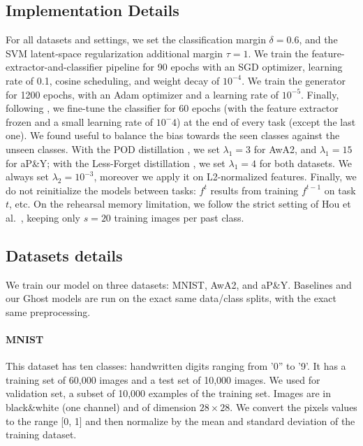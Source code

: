 \subsection{Implementation Details} For all datasets and settings, we set the classification margin
$\delta=0.6$, and the SVM latent-space regularization additional margin $\tau=1$. We train the
feature-extractor-and-classifier pipeline for 90 epochs with an SGD optimizer, learning rate of 0.1,
cosine scheduling, and weight decay of $10^{-4}$. We train the generator for 1200 epochs, with an
Adam optimizer and a learning rate of $10^{-5}$. Finally, following
\cite{hou2019ucir,douillard2020podnet}, we fine-tune the classifier for 60 epochs (with the feature
extractor frozen and a small learning rate of $10^-4$) at the end of every task (except the last
one). We found useful to balance the bias towards the seen classes against the unseen classes. With
the POD distillation \cite{douillard2020podnet}, we set $\lambda_1=3$  for AwA2, and $\lambda_1=15$
for aP\&Y; with the Less-Forget distillation \cite{hou2019ucir}, we set $\lambda_1=4$ for both
datasets. We always set $\lambda_2=10^{-3}$, moreover we apply it on L2-normalized features.
Finally, we do not reinitialize the models between tasks: $f^t$ results from training $f^{t-1}$ on
task $t$, etc. On the rehearsal memory limitation, we follow the strict setting of Hou et
al.~\cite{hou2019ucir}, keeping only $s=20$ training images per past class.

\subsection{Datasets details}

We train our model on three datasets: MNIST, AwA2, and aP\&Y. Baselines and our Ghost models are run
on the exact same data/class splits, with the exact same preprocessing.

\paragraph{MNIST} This dataset has ten classes: handwritten digits ranging from '0'' to '9'. It has
a training set of 60,000 images and a test set of 10,000 images. We used for validation set, a
subset of 10,000 examples of the training set. Images are in black\&white (one channel) and of
dimension $28\times28$. We convert the pixels values to the range [0, 1] and then normalize by the
mean and standard deviation of the training dataset.

